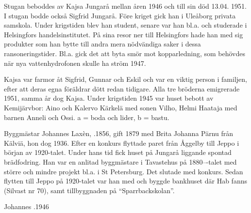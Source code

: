 
Stugan  beboddes av Kajsa Jungarå mellan åren 1946 och till sin död 13.04. 1951. I stugan bodde också Sigfrid Jungarå. Före kriget gick han i Uleåborg privata samskola. Under krigstiden blev han student, senare var han bl.a. och studerade i Helsingfors handelsinstitutet. På sina resor ner till Helsingfors hade han med sig produkter som han bytte till andra mera nödvändiga saker i dessa ransoneringstider. Bl.a. gick det att byta smör mot kopparledning, som behövdes när nya vattenhydrofonen skulle ha ström 1947.

Kajsa var farmor åt Sigfrid, Gunnar och Eskil och var en viktig person i familjen, efter att deras egna föräldrar dött redan tidigare. Alla tre bröderna emigrerade 1951, samma år dog Kajsa. Under 	krigstiden 1945 var huset bebott av Kemijärvbor: Aino och Kalervo Kärkelä med sonen Vilho, Helmi Haataja med barnen Anneli och Ossi. a = boda och lider, b = bastu.


Byggmästar Johannes Laxèn, .1856, gift 1879 med Brita Johanna Pärnu från Kälviä, hon dog 1936. Efter en konkurs flyttade paret från Åggelby till Jeppo i början av 1920-talet. Under hans tid fick huset på Jungarå liggande spontad brädfodring. Han var en anlitad byggmästare i Tavastehus på 1880---talet med större och mindre projekt bl.a. i St Petersburg. Det slutade med konkurs. Sedan flytten till Jeppo på 1920-talet var han med och byggde bankhuset där Hab fanns (Silvast nr 70), samt tillbyggnaden på ``Sparrbackskolan''.

Johannes .1946


